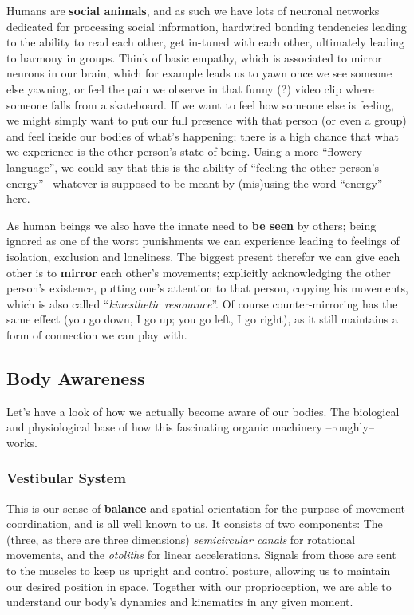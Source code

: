 Humans are \textbf{social animals}, and as such we have lots of neuronal networks dedicated for processing social information, hardwired bonding tendencies leading to the ability to read each other, get in-tuned with each other, ultimately leading to harmony in groups.
Think of basic empathy, which is associated to mirror neurons in our brain, which for example leads us to yawn once we see someone else yawning, or feel the pain we observe in that funny (?) video clip where someone falls from a skateboard.
If we want to feel how someone else is feeling, we might simply want to put our full presence with that person (or even a group) and feel inside our bodies of what's happening; there is a high chance that what we experience is the other person's state of being.
Using a more ``flowery language'', we could say that this is the ability of ``feeling the other person's energy'' --whatever is supposed to be meant by (mis)using the word ``energy'' here.

As human beings we also have the innate need to \textbf{be seen} by others; being ignored as one of the worst punishments we can experience leading to feelings of isolation, exclusion and loneliness.
The biggest present therefor we can give each other is to \textbf{mirror} each other's movements; explicitly acknowledging the other person's existence, putting one's attention to that person, copying his movements, which is also called ``\textit{kinesthetic resonance}''.
Of course counter-mirroring has the same effect (you go down, I go up; you go left, I go right), as it still maintains a form of connection we can play with.

\subsection{Body Awareness}\label{subsec:body-awareness}

Let's have a look of how we actually become aware of our bodies.
The biological and physiological base of how this fascinating organic machinery --roughly-- works.

\subsubsection{Vestibular System}

This is our sense of \textbf{balance} and spatial orientation for the purpose of movement coordination, and is all well known to us.
It consists of two components: The (three, as there are three dimensions) \textit{semicircular canals} for rotational movements, and the \textit{otoliths} for linear accelerations.
Signals from those are sent to the muscles to keep us upright and control posture, allowing us to maintain our desired position in space.
Together with our proprioception, we are able to understand our body's dynamics and kinematics in any given moment.

